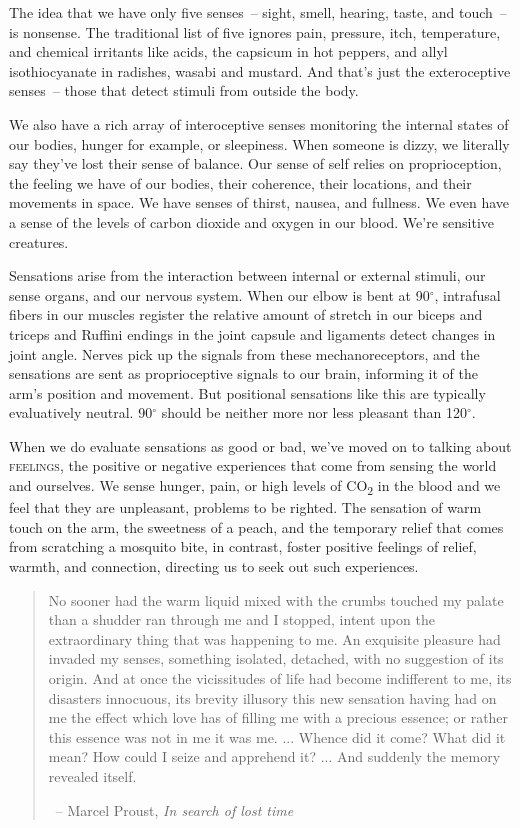 \bigskip

The idea that we have only five senses~-- sight, smell, hearing, taste, and touch~-- is nonsense. The traditional list of five ignores pain, pressure, itch, temperature, and chemical irritants like acids, the capsicum in hot peppers, and allyl isothiocyanate in radishes, wasabi and mustard. And that's just the exteroceptive senses~-- those that detect stimuli from outside the body.

We also have a rich array of interoceptive senses monitoring the internal states of our bodies, hunger for example, or sleepiness. When someone is dizzy, we literally say they've lost their sense of balance. Our sense of self relies on proprioception, the feeling we have of our bodies, their coherence, their locations, and their movements in space. We have senses of thirst, nausea, and fullness. We even have a sense of the levels of carbon dioxide and oxygen in our blood. We're sensitive creatures.

Sensations arise from the interaction between internal or external stimuli, our sense organs, and our nervous system. When our elbow is bent at 90$^{\circ}$, intrafusal fibers in our muscles register the relative amount of stretch in our biceps and triceps and Ruffini endings in the joint capsule and ligaments detect changes in joint angle. Nerves pick up the signals from these mechanoreceptors, and the sensations are sent as proprioceptive signals to our brain, informing it of the arm's position and movement. But positional sensations like this are typically evaluatively neutral. 90$^{\circ}$ should be neither more nor less pleasant than 120$^{\circ}$.

When we do evaluate sensations as good or bad, we've moved on to talking about \textsc{feelings}, the positive or negative experiences that come from sensing the world and ourselves. We sense hunger, pain, or high levels of CO\textsubscript{2} in the blood and we feel that they are unpleasant, problems to be righted. The sensation of warm touch on the arm, the sweetness of a peach, and the temporary relief that comes from scratching a mosquito bite, in contrast, foster positive feelings of relief, warmth, and connection, directing us to seek out such experiences.

\begin{quote}
    No sooner had the warm liquid mixed with the crumbs touched my palate than a shudder ran through me and I stopped, intent upon the extraordinary thing that was happening to me. An exquisite pleasure had invaded my senses, something isolated, detached, with no suggestion of its origin. And at once the vicissitudes of life had become indifferent to me, its disasters innocuous, its brevity illusory this new sensation having had on me the effect which love has of filling me with a precious essence; or rather this essence was not in me it was me. ... Whence did it come? What did it mean? How could I seize and apprehend it? ... And suddenly the memory revealed itself. \par\raggedleft~-- Marcel Proust, \textit{In search of lost time}
\end{quote}

